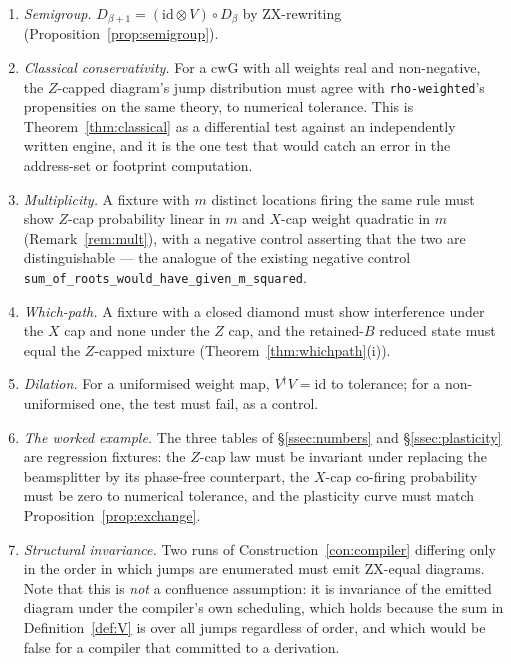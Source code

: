 \documentclass[11pt]{article}
\theoremstyle{definition}
\theoremstyle{plain}
\newcommand{\id}{\mathrm{id}}
\newcommand{\cwG}{\mathrm{cwG}}
\begin{document}
\begin{enumerate}[leftmargin=*]
  \item \emph{Semigroup.} $D_{\beta+1} = (\id\otimes V)\circ D_\beta$ by ZX-rewriting
        (Proposition~\ref{prop:semigroup}).
  \item \emph{Classical conservativity.} For a $\cwG$ with all weights real and non-negative, the
        $Z$-capped diagram's jump distribution must agree with \texttt{rho-weighted}'s
        propensities on the same theory, to numerical tolerance. This is
        Theorem~\ref{thm:classical} as a differential test against an independently written
        engine, and it is the one test that would catch an error in the address-set or footprint
        computation.
  \item \emph{Multiplicity.} A fixture with $m$ distinct locations firing the same rule must show
        $Z$-cap probability linear in $m$ and $X$-cap weight quadratic in $m$
        (Remark~\ref{rem:mult}), with a negative control asserting that the two are
        distinguishable --- the analogue of the existing negative control
        \texttt{sum\_of\_roots\_\-would\_\-have\_\-given\_\-m\_\-squared}.
  \item \emph{Which-path.} A fixture with a closed diamond must show interference under the $X$
        cap and none under the $Z$ cap, and the retained-$B$ reduced state must equal the
        $Z$-capped mixture (Theorem~\ref{thm:whichpath}(i)).
  \item \emph{Dilation.} For a uniformised weight map, $V^\dagger V = \id$ to tolerance; for a
        non-uniformised one, the test must fail, as a control.
  \item \emph{The worked example.} The three tables of \S\ref{ssec:numbers} and
        \S\ref{ssec:plasticity} are regression fixtures: the $Z$-cap law must be
        invariant under replacing the beamsplitter by its phase-free
        counterpart, the $X$-cap co-firing probability must be zero to
        numerical tolerance, and the plasticity curve must match
        Proposition~\ref{prop:exchange}.
  \item \emph{Structural invariance.} Two runs of Construction~\ref{con:compiler} differing only
        in the order in which jumps are enumerated must emit ZX-equal diagrams. Note that this is
        \emph{not} a confluence assumption: it is invariance of the emitted diagram under the
        compiler's own scheduling, which holds because the sum in Definition~\ref{def:V} is over
        all jumps regardless of order, and which would be false for a compiler that committed to
        a derivation.
\end{enumerate}
\end{document}

